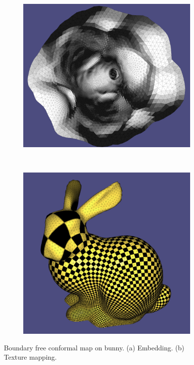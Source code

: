 \begin{figure}
\centering
\begin{subfigure}{0.3\textwidth}
\includegraphics[height = \textwidth]{images/bunny_free_emb}
\caption{}
\end{subfigure}\ \ \ \ \ \ \ \ \ \ \ \ \
\begin{subfigure}{0.3\textwidth}
\includegraphics[height = \textwidth]{images/bunny_free_texture}
\caption{}
\end{subfigure}
\caption{Boundary free conformal map on bunny. (a) Embedding. (b) Texture mapping.}
\label{fig:boundary-free}
\end{figure}


